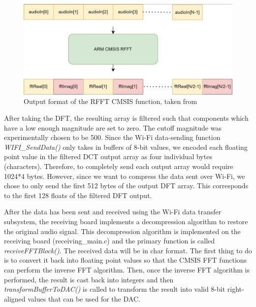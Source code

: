\documentclass[journal]{IEEEtran}
\begin{document}
\begin{figure}[H]
    \centering
    \includegraphics[width=0.8\linewidth]{bibtex/Images/rfft_cmsis_output.png}
    \caption{Output format of the RFFT CMSIS function, taken from \cite{youtube video}}
    \label{fig:FFT Output}
\end{figure}

After taking the DFT, the resulting array is filtered such that components which have a low enough magnitude are set to zero. The cutoff magnitude was experimentally chosen to be 500. Since the Wi-Fi data-sending function \textit{WIFI\_SendData()} only takes in buffers of 8-bit values, we encoded each floating point value in the filtered DCT output array as four individual bytes (characters). Therefore, to completely send each output array would require 1024*4 bytes. However, since we want to compress the data sent over Wi-Fi, we chose to only send the first 512 bytes of the output DFT array. This corresponds to the first 128 floats of the filtered DFT output.

After the data has been sent and received using the Wi-Fi data transfer subsystem, the receiving board implements a decompression algorithm to restore the original audio signal. This decompression algorithm is implemented on the receiving board (receiving\_main.c) and the primary function is called \textit{receiveFFTBlock()}. The received data will be in char format. The first thing to do is to convert it back into floating point values so that the CMSIS FFT functions can perform the inverse FFT algorithm. Then, once the inverse FFT algorithm is performed, the result is cast back into integers and then \textit{transformBufferToDAC()} is called to transform the result into valid 8-bit right-aligned values that can be used for the DAC. 
\end{document}
